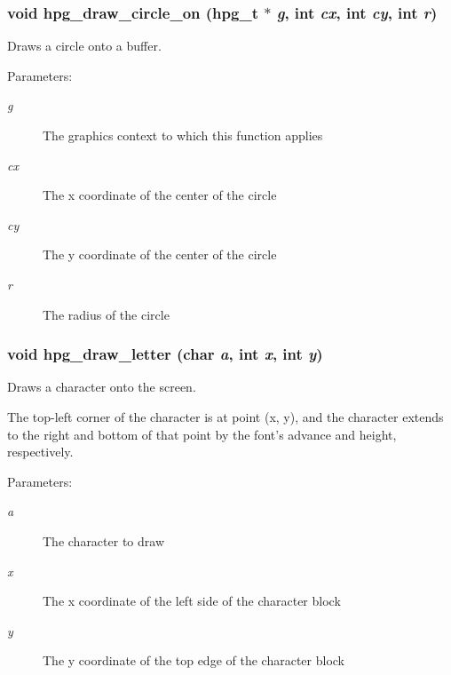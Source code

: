 \subsubsection{\setlength{\rightskip}{0pt plus 5cm}void hpg\_\-draw\_\-circle\_\-on ({\bf hpg\_\-t} $\ast$ {\em g}, int {\em cx}, int {\em cy}, int {\em r})}\label{hpgraphics_8h_a48}


Draws a circle onto a buffer.

\begin{Desc}
\item[Parameters: ]\par
\begin{description}
\item[{\em 
g}]The graphics context to which this function applies \item[{\em 
cx}]The x coordinate of the center of the circle \item[{\em 
cy}]The y coordinate of the center of the circle \item[{\em 
r}]The radius of the circle \end{description}
\end{Desc}
\subsubsection{\setlength{\rightskip}{0pt plus 5cm}void hpg\_\-draw\_\-letter (char {\em a}, int {\em x}, int {\em y})}\label{hpgraphics_8h_a59}


Draws a character onto the screen.

The top-left corner of the character is at point (x, y), and the character extends to the right and bottom of that point by the font's advance and height, respectively.\begin{Desc}
\item[Parameters: ]\par
\begin{description}
\item[{\em 
a}]The character to draw \item[{\em 
x}]The x coordinate of the left side of the character block \item[{\em 
y}]The y coordinate of the top edge of the character block \end{description}
\end{Desc}
